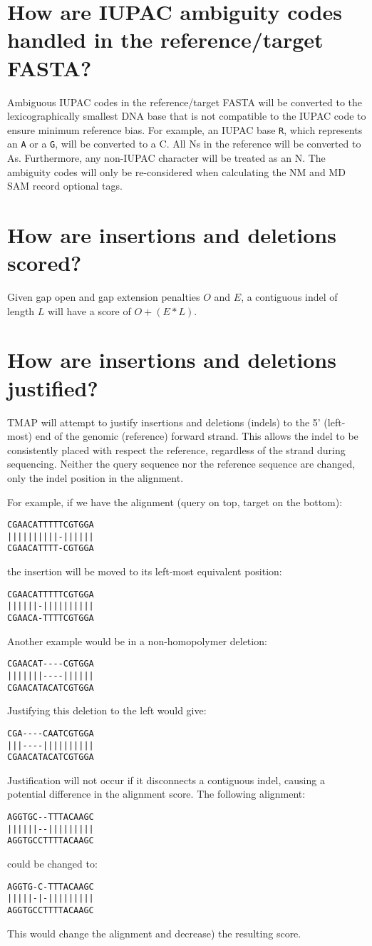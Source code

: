 \documentclass[a4paper,12pt]{book}
\newcommand{\TT}[1]{{\tt #1}} %
\begin{document}
\section{How are IUPAC ambiguity codes handled in the reference/target FASTA?}
\label{sec:iupac}
Ambiguous IUPAC codes in the reference/target FASTA will be converted to the lexicographically smallest DNA base that is not compatible to the IUPAC code to ensure minimum reference bias.
For example, an IUPAC base \TT{R}, which represents an \TT{A} or a \TT{G}, will be converted to a C.
All Ns in the reference will be converted to As.
Furthermore, any non-IUPAC character will be treated as an N.
The ambiguity codes will only be re-considered when calculating the NM and MD SAM record optional tags.

\section{How are insertions and deletions scored?}
\label{sec:indel-scoring}
Given gap open and gap extension penalties $O$ and $E$, a contiguous indel of length $L$ will have a score of $O + (E * L)$.

\section{How are insertions and deletions justified?}
\label{sec:indel-justification}
TMAP will attempt to justify insertions and deletions (indels) to the 5' (left-most) end of the genomic (reference) forward strand.
This allows the indel to be consistently placed with respect the reference, regardless of the strand during sequencing.
Neither the query sequence nor the reference sequence are changed, only the indel position in the alignment.

For example, if we have the alignment (query on top, target on the bottom):
\begin{verbatim}
CGAACATTTTTCGTGGA
||||||||||-||||||
CGAACATTTT-CGTGGA
\end{verbatim}
the insertion will be moved to its left-most equivalent position:
\begin{verbatim}
CGAACATTTTTCGTGGA
||||||-||||||||||
CGAACA-TTTTCGTGGA
\end{verbatim}
Another example would be in a non-homopolymer deletion: 
\begin{verbatim}
CGAACAT----CGTGGA
|||||||----||||||
CGAACATACATCGTGGA
\end{verbatim}
Justifying this deletion to the left would give:
\begin{verbatim}
CGA----CAATCGTGGA
|||----||||||||||
CGAACATACATCGTGGA
\end{verbatim}
Justification will not occur if it disconnects a contiguous indel, causing a potential difference in the alignment score.
The following alignment:
\begin{verbatim}
AGGTGC--TTTACAAGC
||||||--|||||||||
AGGTGCCTTTTACAAGC
\end{verbatim}
could be changed to: 
\begin{verbatim}
AGGTG-C-TTTACAAGC
|||||-|-|||||||||
AGGTGCCTTTTACAAGC
\end{verbatim}
This would change the alignment and decrease) the resulting score.
\end{document}
